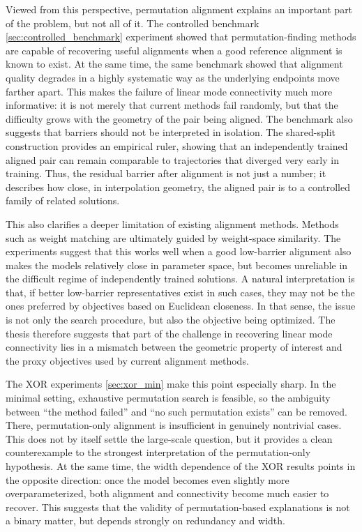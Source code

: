 \documentclass[11pt,a4paper]{report}
\begin{document}
Viewed from this perspective, permutation alignment explains an important part of the problem, but not all of it. The controlled benchmark \ref{sec:controlled_benchmark} experiment showed that permutation-finding methods are capable of recovering useful alignments when a good reference alignment is known to exist. At the same time, the same benchmark showed that alignment quality degrades in a highly systematic way as the underlying endpoints move farther apart. This makes the failure of linear mode connectivity much more informative: it is not merely that current methods fail randomly, but that the difficulty grows with the geometry of the pair being aligned. The benchmark also suggests that barriers should not be interpreted in isolation. The shared-split construction provides an empirical ruler, showing that an independently trained aligned pair can remain comparable to trajectories that diverged very early in training. Thus, the residual barrier after alignment is not just a number; it describes how close, in interpolation geometry, the aligned pair is to a controlled family of related solutions.

This also clarifies a deeper limitation of existing alignment methods. Methods such as weight matching are ultimately guided by weight-space similarity. The experiments suggest that this works well when a good low-barrier alignment also makes the models relatively close in parameter space, but becomes unreliable in the difficult regime of independently trained solutions. A natural interpretation is that, if better low-barrier representatives exist in such cases, they may not be the ones preferred by objectives based on Euclidean closeness. In that sense, the issue is not only the search procedure, but also the objective being optimized. The thesis therefore suggests that part of the challenge in recovering linear mode connectivity lies in a mismatch between the geometric property of interest and the proxy objectives used by current alignment methods.

The XOR experiments \ref{sec:xor_min} make this point especially sharp. In the minimal setting, exhaustive permutation search is feasible, so the ambiguity between ``the method failed'' and ``no such permutation exists'' can be removed. There, permutation-only alignment is insufficient in genuinely nontrivial cases. This does not by itself settle the large-scale question, but it provides a clean counterexample to the strongest interpretation of the permutation-only hypothesis. At the same time, the width dependence of the XOR results points in the opposite direction: once the model becomes even slightly more overparameterized, both alignment and connectivity become much easier to recover. This suggests that the validity of permutation-based explanations is not a binary matter, but depends strongly on redundancy and width.
\end{document}
